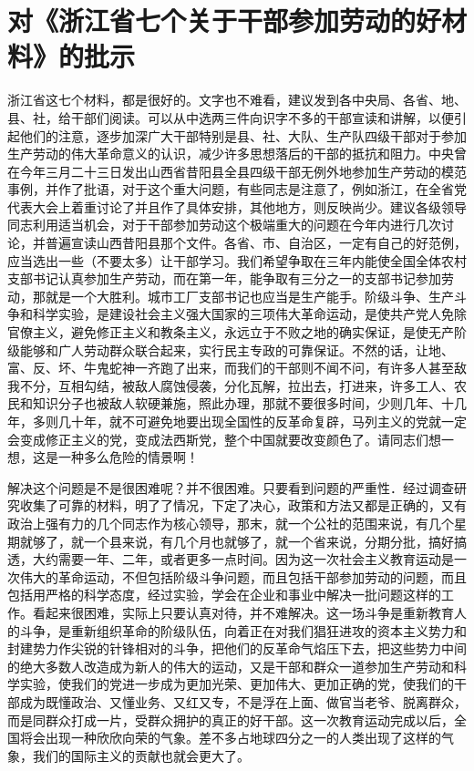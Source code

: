 \section[对《浙江省七个关于干部参加劳动的好材料》的批示（一九六三年五月九日）]{对《浙江省七个关于干部参加劳动的好材料》的批示}


浙江省这七个材料，都是很好的。文字也不难看，建议发到各中央局、各省、地、县、社，给干部们阅读。可以从中选两三件向识字不多的干部宣读和讲解，以便引起他们的注意，逐步加深广大干部特别是县、社、大队、生产队四级干部对于参加生产劳动的伟大革命意义的认识，减少许多思想落后的干部的抵抗和阻力。中央曾在今年三月二十三日发出山西省昔阳县全县四级干部无例外地参加生产劳动的模范事例，并作了批语，对于这个重大问题，有些同志是注意了，例如浙江，在全省党代表大会上着重讨论了并且作了具体安排，其他地方，则反映尚少。建议各级领导同志利用适当机会，对于干部参加劳动这个极端重大的问题在今年内进行几次讨论，并普遍宣读山西昔阳县那个文件。各省、市、自治区，一定有自己的好范例，应当选出一些（不要太多）让干部学习。我们希望争取在三年内能使全国全体农村支部书记认真参加生产劳动，而在第一年，能争取有三分之一的支部书记参加劳动，那就是一个大胜利。城市工厂支部书记也应当是生产能手。阶级斗争、生产斗争和科学实验，是建设社会主义强大国家的三项伟大革命运动，是使共产党人免除官僚主义，避免修正主义和教条主义，永远立于不败之地的确实保证，是使无产阶级能够和广人劳动群众联合起来，实行民主专政的可靠保证。不然的话，让地、富、反、坏、牛鬼蛇神一齐跑了出来，而我们的干部则不闻不问，有许多人甚至敌我不分，互相勾结，被敌人腐蚀侵袭，分化瓦解，拉出去，打进来，许多工人、农民和知识分子也被敌人软硬兼施，照此办理，那就不要很多时间，少则几年、十几年，多则几十年，就不可避免地要出现全国性的反革命复辟，马列主义的党就一定会变成修正主义的党，变成法西斯党，整个中国就要改变颜色了。请同志们想一想，这是一种多么危险的情景啊！

解决这个问题是不是很困难呢？并不很困难。只要看到问题的严重性．经过调查研究收集了可靠的材料，明了了情况，下定了决心，政策和方法又都是正确的，又有政治上强有力的几个同志作为核心领导，那末，就一个公社的范围来说，有几个星期就够了，就一个县来说，有几个月也就够了，就一个省来说，分期分批，搞好搞透，大约需要一年、二年，或者更多一点时间。因为这一次社会主义教育运动是一次伟大的革命运动，不但包括阶级斗争问题，而且包括干部参加劳动的问题，而且包括用严格的科学态度，经过实验，学会在企业和事业中解决一批问题这样的工作。看起来很困难，实际上只要认真对待，并不难解决。这一场斗争是重新教育人的斗争，是重新组织革命的阶级队伍，向着正在对我们猖狂进攻的资本主义势力和封建势力作尖锐的针锋相对的斗争，把他们的反革命气焰压下去，把这些势力中间的绝大多数人改造成为新人的伟大的运动，又是干部和群众一道参加生产劳动和科学实验，使我们的党进一步成为更加光荣、更加伟大、更加正确的党，使我们的干部成为既懂政治、又懂业务、又红又专，不是浮在上面、做官当老爷、脱离群众，而是同群众打成一片，受群众拥护的真正的好干部。这一次教育运动完成以后，全国将会出现一种欣欣向荣的气象。差不多占地球四分之一的人类出现了这样的气象，我们的国际主义的贡献也就会更大了。



